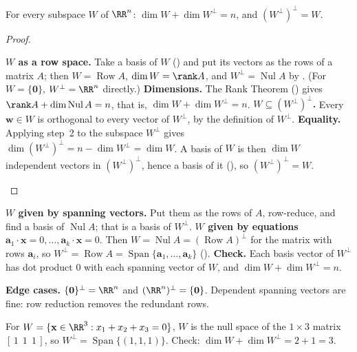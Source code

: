 \documentclass[10pt]{scrartcl}
\newcommand{\vv}[1]{\mathbf{#1}}
\DeclareMathOperator{\spn}{Span}\DeclareMathOperator{\Nul}{Nul}\DeclareMathOperator{\Col}{Col}\DeclareMathOperator{\Row}{Row}\DeclareMathOperator{\tr}{tr}\DeclareMathOperator{\proj}{proj}\DeclareMathOperator{\dist}{dist}
\newenvironment{howto}[1]{\begin{mdframed}[style=howtostyle,frametitle={#1}]}{\end{mdframed}}
\begin{document}
\begin{proposition*}[Dimension of $W^\perp$ and $(W^\perp)^\perp=W$]
  For every subspace $W$ of $\RR^n$: $\dim W+\dim W^\perp=n$, and $(W^\perp)^\perp=W$.
\end{proposition*}
\begin{proof}
  \begin{steps}
    \ii \textbf{$W$ as a row space.} Take a basis of $W$ () and put its vectors as the rows of a matrix $A$; then $W=\Row A$, $\dim W=\rank A$, and $W^\perp=\Nul A$ by . (For $W=\{\vv 0\}$, $W^\perp=\RR^n$ directly.)
    \ii \textbf{Dimensions.} The Rank Theorem () gives $\rank A+\dim\Nul A=n$, that is, $\dim W+\dim W^\perp=n$.
    \ii \textbf{$W\subseteq(W^\perp)^\perp$.} Every $\vv w\in W$ is orthogonal to every vector of $W^\perp$, by the definition of $W^\perp$.
    \ii \textbf{Equality.} Applying step~2 to the subspace $W^\perp$ gives $\dim(W^\perp)^\perp=n-\dim W^\perp=\dim W$. A basis of $W$ is then $\dim W$ independent vectors in $(W^\perp)^\perp$, hence a basis of it (), so $(W^\perp)^\perp=W$. \qedhere
  \end{steps}
\end{proof}

\begin{howto}{How to find the orthogonal complement $W^\perp$}
  \begin{steps}
    \ii \textbf{$W$ given by spanning vectors.} Put them as the rows of $A$, row-reduce, and find a basis of $\Nul A$; that is a basis of $W^\perp$.
    \ii \textbf{$W$ given by equations} $\vv a_1\cdot\vv x=0,\dots,\vv a_k\cdot\vv x=0$. Then $W=\Nul A=(\Row A)^\perp$ for the matrix with rows $\vv a_i$, so $W^\perp=\Row A=\spn\{\vv a_1,\dots,\vv a_k\}$ ().
    \ii \textbf{Check.} Each basis vector of $W^\perp$ has dot product $0$ with each spanning vector of $W$, and $\dim W+\dim W^\perp=n$.
  \end{steps}
  \textbf{Edge cases.} $\{\vv 0\}^\perp=\RR^n$ and $(\RR^n)^\perp=\{\vv 0\}$. Dependent spanning vectors are fine: row reduction removes the redundant rows.
\end{howto}

\begin{example*}
  For $W=\{\vv x\in\RR^3: x_1+x_2+x_3=0\}$, $W$ is the null space of the $1\times 3$ matrix $[\,1\ \ 1\ \ 1\,]$, so $W^\perp=\spn\{(1,1,1)\}$. Check: $\dim W+\dim W^\perp=2+1=3$.
\end{example*}
\end{document}
